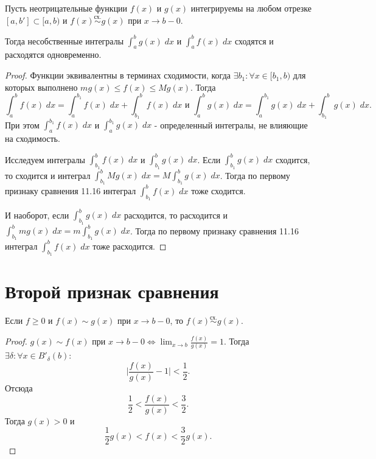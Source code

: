 	\begin{theorem}
		Пусть неотрицательные функции $f(x)$ и $g(x)$ интегрируемы на
		любом отрезке $[a, b'] \subset [a, b)$ и $f(x) \overset{\text{сх.}}{\sim} g(x)$ при $x \rightarrow b - 0$.
		
		Тогда несобственные интегралы $\int_a^b g(x) \; dx$ и $\int_a^b f(x) \; dx$ сходятся и расходятся одновременно.
	\end{theorem}
	
	\begin{proof}
		Функции эквивалентны в терминах сходимости, когда $\exists b_1 : \forall x \in [b_1, b)$ для которых выполнено $mg(x) \leqslant f(x) \leqslant Mg(x)$. Тогда
		\[ \int_a^b f(x) \; dx = \int_a^{b_1} f(x) \; dx + \int_{b_1}^b f(x) \; dx \text{ и } \int_a^b g(x) \; dx = \int_a^{b_1} g(x) \; dx + \int_{b_1}^b g(x) \; dx. \]
	    При этом $\int_a^{b_1} f(x) \; dx$ и $\int_a^{b_1} g(x) \; dx$ - определенный интегралы, не влияющие на сходимость. 
	    
	    Исследуем интегралы $\int_{b_1}^b f(x) \; dx$ и $\int_{b_1}^b g(x) \; dx$. Если $\int_{b_1}^b g(x) \; dx$ сходится, то сходится и интеграл $\int_{b_1}^b M g(x) \; dx = M \int_{b_1}^b g(x) \; dx$. Тогда по первому признаку сравнения 11.16 интеграл $\int_{b_1}^b f(x) \; dx$ тоже сходится.
	    
	    И наоборот, если $\int_{b_1}^b g(x) \; dx$ расходится, то расходится и $\int_{b_1}^b m g(x) \; dx = m \int_{b_1}^b g(x) \; dx$. Тогда по первому признаку сравнения 11.16 интеграл $\int_{b_1}^b f(x) \; dx$ тоже расходится.
	\end{proof}
	
	\section{Второй признак сравнения}
	
	\begin{sentence}
		Если $f \geqslant 0$ и $f(x) \sim g(x)$ при $x \rightarrow b - 0$, то $f(x) \overset{\text{сх.}}{\sim} g(x)$.
	\end{sentence}
	
	\begin{proof}
		$g(x) \sim f(x)$ при $x \to b - 0 \Leftrightarrow \lim_{x \to b} \frac{f(x)}{g(x)} = 1$. Тогда $\exists \delta: \forall x \in B'_\delta(b):$
		\[ \bigg|\frac{f(x)}{g(x)} - 1\bigg| < \frac{1}{2}. \]
		Отсюда
		\[ \frac{1}{2} < \frac{f(x)}{g(x)} < \frac{3}{2}. \]
		Тогда $g(x) > 0$ и
		\[ \frac{1}{2} g(x) < f(x) < \frac{3}{2} g(x). \]
	\end{proof}
	
